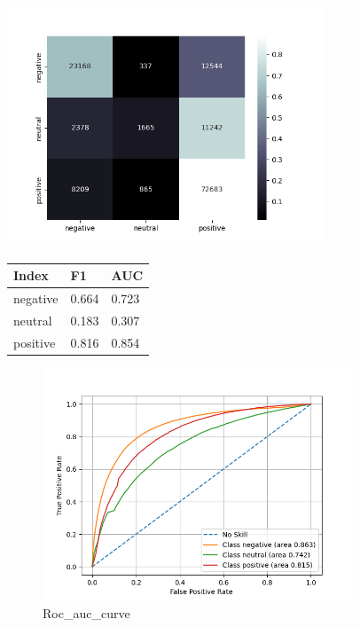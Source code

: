 \documentclass{article}%
\begin{document}
{\begin{minipage}[c]{0.95\textwidth}
\begin{minipage}{0.55\textwidth}
\end{minipage}%
\end{minipage}%
\linebreak%
\begin{minipage}{0.7\textwidth}%
\begin{minipage}{0.8\textwidth}%
\includegraphics[width=360px]{./report/Learning/Random_Forest/confusion-matrix.png}%
\end{minipage}%
\begin{minipage}{0.5\textwidth}%
\begin{tabu}[t]{X[r] | X[r] X[r]}%
\hline%
\textbf{Index}&\textbf{F1}&\textbf{AUC}\\%
\hline%
negative&0.664&0.723\\%
neutral&0.183&0.307\\%
positive&0.816&0.854\\%
\end{tabu}%
\end{minipage}%
\end{minipage}%


\begin{figure}[h!]%
\centering%
\includegraphics[width=350px]{./report/Learning/Random_Forest/True-Positive-Rate.png}%
\caption{Roc\_auc\_curve}%
\end{figure}

}
\end{document}

